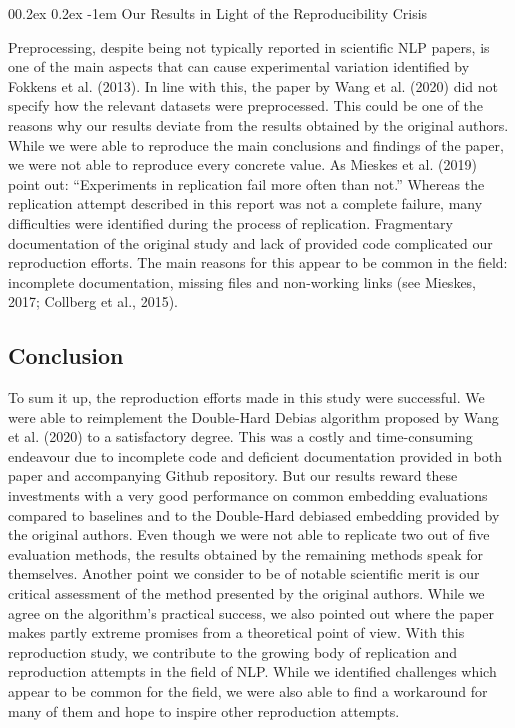 \documentclass[
  english,
  man,floatsintext]{apa6}
\makeatletter
\let\oldparagraph\paragraph
\renewcommand{\paragraph}[1]{\oldparagraph{#1}\mbox{}}
\renewcommand{\paragraph}{\@startsection{paragraph}{4}{\parindent}%
  {0\baselineskip \@plus 0.2ex \@minus 0.2ex}%
  {-1em}%
  {\normalfont\normalsize\bfseries\itshape\typesectitle}}
\makeatother
\begin{document}
\hypertarget{our-results-in-light-of-the-reproducibility-crisis}{%
\paragraph{Our Results in Light of the Reproducibility Crisis}\label{our-results-in-light-of-the-reproducibility-crisis}}

Preprocessing, despite being not typically reported in scientific NLP papers, is one of the main aspects that can cause experimental variation identified by Fokkens et al. (2013). In line with this, the paper by Wang et al. (2020) did not specify how the relevant datasets were preprocessed. This could be one of the reasons why our results deviate from the results obtained by the original authors. While we were able to reproduce the main conclusions and findings of the paper, we were not able to reproduce every concrete value. As Mieskes et al. (2019) point out: \enquote{Experiments in replication fail more often than not.} Whereas the replication attempt described in this report was not a complete failure, many difficulties were identified during the process of replication. Fragmentary documentation of the original study and lack of provided code complicated our reproduction efforts. The main reasons for this appear to be common in the field: incomplete documentation, missing files and non-working links (see Mieskes, 2017; Collberg et al., 2015).

\hypertarget{conclusion}{%
\subsection{Conclusion}\label{conclusion}}

To sum it up, the reproduction efforts made in this study were successful. We were able to reimplement the Double-Hard Debias algorithm proposed by Wang et al. (2020) to a satisfactory degree. This was a costly and time-consuming endeavour due to incomplete code and deficient documentation provided in both paper and accompanying Github repository. But our results reward these investments with a very good performance on common embedding evaluations compared to baselines and to the Double-Hard debiased embedding provided by the original authors. Even though we were not able to replicate two out of five evaluation methods, the results obtained by the remaining methods speak for themselves. Another point we consider to be of notable scientific merit is our critical assessment of the method presented by the original authors. While we agree on the algorithm's practical success, we also pointed out where the paper makes partly extreme promises from a theoretical point of view. With this reproduction study, we contribute to the growing body of replication and reproduction attempts in the field of NLP. While we identified challenges which appear to be common for the field, we were also able to find a workaround for many of them and hope to inspire other reproduction attempts.
\end{document}
